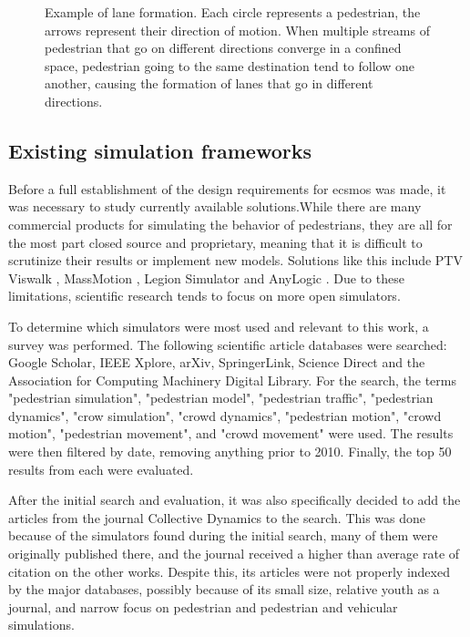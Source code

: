 \documentclass[twoside, 11pt]{article}
\begin{document}
\begin{figure}[!h]
  \centering
  
  \caption[Example of lane formation]{Example of lane formation. Each circle represents a pedestrian, the arrows represent their direction of motion. When multiple streams of pedestrian that go on different directions converge in a confined space, pedestrian going to the same destination tend to follow one another, causing the formation of lanes that go in different directions.}
  \label{fig:lane-formation}
\end{figure}

\subsection{Existing simulation frameworks} \label{sec:existing-frameworks}

Before a full establishment of the design requirements for \gls{ecsmos} was made, it was necessary to study currently available solutions.While there are many commercial products for simulating the behavior of pedestrians, they are all for the most part closed source and proprietary, meaning that it is difficult to scrutinize their results or implement new models. Solutions like this include PTV Viswalk \cite{viswalk}, MassMotion \cite{massmotion}, Legion Simulator \cite{legionsimulator} and AnyLogic \cite{anylogic}. Due to these limitations, scientific research tends to focus on more open simulators. 

To determine which simulators were most used and relevant to this work, a survey was performed. The following scientific article databases were searched: Google Scholar, IEEE Xplore, arXiv, SpringerLink, Science Direct and the Association for Computing Machinery Digital Library. For the search, the terms "pedestrian simulation", "pedestrian model", "pedestrian traffic", "pedestrian dynamics", "crow simulation", "crowd dynamics", "pedestrian motion", "crowd motion", "pedestrian movement", and "crowd movement" were used.
The results were then filtered by date, removing anything prior to 2010. Finally, the top 50 results from each were evaluated.

After the initial search and evaluation, it was also specifically decided to add the articles from the journal Collective Dynamics to the search. This was done because of the simulators found during the initial search, many of them were originally published there, and the journal received a higher than average rate of citation on the other works. Despite this, its articles were not properly indexed by the major databases, possibly because of its small size, relative youth as a journal, and narrow focus on pedestrian and pedestrian and vehicular simulations. 
\end{document}
